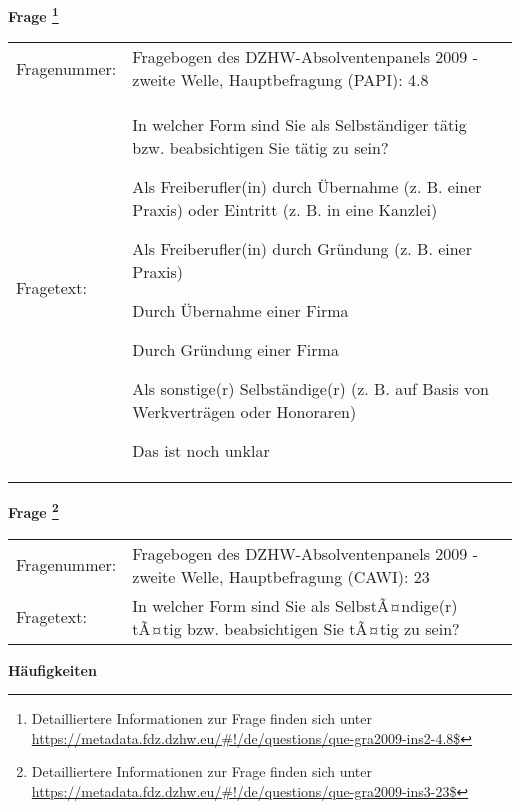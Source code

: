 				\vspace*{0.5cm}
                \noindent\textbf{Frage
	                \footnote{Detailliertere Informationen zur Frage finden sich unter
		              \url{https://metadata.fdz.dzhw.eu/\#!/de/questions/que-gra2009-ins2-4.8$}}}\\
				\begin{tabularx}{\hsize}{@{}lX}
					Fragenummer: &
					  Fragebogen des DZHW-Absolventenpanels 2009 - zweite Welle, Hauptbefragung (PAPI):
					  4.8
 \\
					Fragetext: & In welcher Form sind Sie als Selbständiger tätig bzw. beabsichtigen Sie tätig zu sein?\par  Als Freiberufler(in) durch Übernahme (z. B. einer Praxis) oder Eintritt (z. B. in eine Kanzlei)\par  Als Freiberufler(in) durch Gründung (z. B. einer Praxis)\par  Durch Übernahme einer Firma\par  Durch Gründung einer Firma\par  Als sonstige(r) Selbständige(r) (z. B. auf Basis von Werkverträgen oder Honoraren)\par  Das ist noch unklar \\
				\end{tabularx}
				\vspace*{0.5cm}
                \noindent\textbf{Frage
	                \footnote{Detailliertere Informationen zur Frage finden sich unter
		              \url{https://metadata.fdz.dzhw.eu/\#!/de/questions/que-gra2009-ins3-23$}}}\\
				\begin{tabularx}{\hsize}{@{}lX}
					Fragenummer: &
					  Fragebogen des DZHW-Absolventenpanels 2009 - zweite Welle, Hauptbefragung (CAWI):
					  23
 \\
					Fragetext: & In welcher Form sind Sie als SelbstÃ¤ndige(r) tÃ¤tig bzw. beabsichtigen Sie tÃ¤tig zu sein? \\
				\end{tabularx}





        		\vspace*{0.5cm}
                \noindent\textbf{Häufigkeiten}

